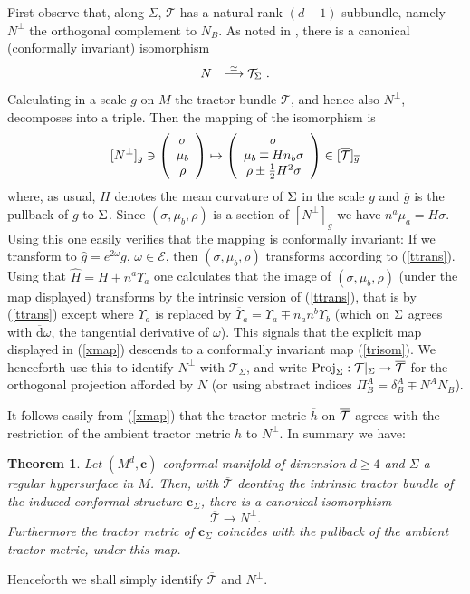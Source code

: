 \documentclass[a4paper,12pt]{amsart}
\def\Cal{\mathcal}
\newcommand{\ocT}{\overline{\cT}}
\newcommand{\cc}{\boldsymbol{c}}
\newcommand{\ce}{{\Cal E}}
\newcommand{\ct}{{\Cal T}}
\newcommand{\cT}{{\mathcal T}}
\newcommand{\om}{\omega}
\newcommand{\si}{\sigma}
\newtheorem{theorem}{Theorem}[section]
\theoremstyle{remark}
\newcommand{\nn}[1]{(\ref{#1})}
\begin{document}
First observe that, along $\Sigma$, $\cT$ has a natural rank
$(d+1)$-subbundle, namely $N^\perp$ the orthogonal complement to
$N_B$. 
As noted in \cite{BrGonon,Grant}, there is a canonical (conformally
invariant) isomorphism
\begin{equation}\label{trisom}
N^\perp \stackrel{\simeq}{\longrightarrow} \ct_\S ~.
\end{equation} 
Calculating in a scale $g$ on $M$ the tractor bundle $\cT$, and hence also $N^\perp$, decomposes into a triple. Then the mapping of the isomorphism 
is 
\begin{equation}\label{xmap}
[N^\perp]_g\ni \left( \begin{array}{c}
\si\\
\mu_b\\ \rho
\end{array} \right) \mapsto 
\left( \begin{array}{c}
\si\\
\mu_b  \mp H n_b \si
\\ \rho \pm \frac{1}{2}H^2 \si
\end{array} \right) \in [\bcT]_{\overline{g}}
\end{equation}
 where, as usual, $H$ denotes the mean curvature of $\S$ in the scale
 $g$ and $\overline{g}$ is the pullback of $g$ to $\S$.  Since
 $(\si,\mu_b,\rho )$ is a section of $[N^\perp]_g$ we have $n^a \mu_a=
 H\si$. Using this one easily verifies that the mapping is conformally
 invariant: If we transform to $\widehat{g}=e^{2\om}g$, $\om\in \ce$,
 then $(\si,\mu_b,\rho )$ transforms according to \nn{ttrans}. Using
 that $\widehat{H}=H+n^a\Upsilon_a$ one calculates that the image of
 $(\si,\mu_b,\rho )$ (under the map displayed) transforms by the
 intrinsic version of \nn{ttrans}, that is by \nn{ttrans} except where
 $\Upsilon_a$ is replaced by $\overline{\Upsilon}_a=\Upsilon_a \mp
 n_an^b\Upsilon_b$ (which on $\S$ agrees with $\overline{\mathrm{d}}
 \omega$, the tangential derivative of $\omega$). This signals that the explicit map displayed in \nn{xmap}
 descends to a conformally invariant map \nn{trisom}. We henceforth
 use this to identify $N^\perp$ with $\cT_\Sigma$, and write
 $\Proj_{\Sigma}:\ct|_\Sigma\to \bcT$ for the orthogonal projection
 afforded by $N$ (or using abstract indices $\Pi^A_B=\delta^A_B \mp N^A N_B$).

It follows easily from \nn{xmap} that the tractor metric $\overline{h}$
on $\bcT$ agrees with the restriction of the ambient tractor metric
$h$ to $N^\perp$. In summary we have: 
\begin{theorem}\label{idts}
Let $(M^d,\cc)$ conformal manifold of dimension $d\geq 4$ and $\Sigma$
a regular hypersurface in $M$. Then, with $\ocT$ deonting the
intrinsic tractor bundle of the induced conformal structure
$\cc_\Sigma$, there is a canonical isomorphism
$$
\ocT\to N^\perp .
$$ Furthermore the tractor metric of $\cc_\Sigma$ coincides with the
pullback of the ambient tractor metric, under this map.
\end{theorem}
\noindent Henceforth we shall simply identify $\ocT$ and $N^\perp$. 
\end{document}
